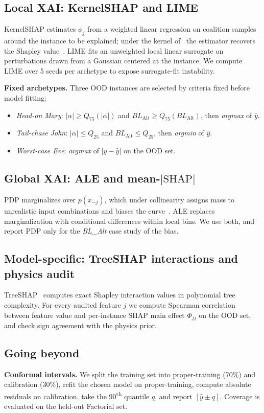 \documentclass[conference]{IEEEtran}
\begin{document}
\subsection{Local XAI: KernelSHAP and LIME}
KernelSHAP estimates $\phi_j$ from a weighted linear regression on coalition samples around the instance to be explained; under the kernel of~\cite{lundberg2017} the estimator recovers the Shapley value~\cite{shapley1953}. LIME fits an unweighted local linear surrogate on perturbations drawn from a Gaussian centered at the instance. We compute LIME over 5 seeds per archetype to expose surrogate-fit instability.

\textbf{Fixed archetypes.} Three OOD instances are selected by criteria fixed before model fitting:
\begin{itemize}
    \item \textit{Head-on Mary}: $|\alpha| \geq Q_{75}(|\alpha|)$ and $BL_{\text{Alt}} \geq Q_{75}(BL_{\text{Alt}})$, then \textit{argmax} of $\hat{y}$.
    \item \textit{Tail-chase John}: $|\alpha| \leq Q_{25}$ and $BL_{\text{Alt}} \leq Q_{25}$, then \textit{argmin} of $\hat{y}$.
    \item \textit{Worst-case Eve}: \textit{argmax} of $|y - \hat{y}|$ on the OOD set.
\end{itemize}

\subsection{Global XAI: ALE and mean-$|\text{SHAP}|$}
PDP marginalizes over $p(x_{-j})$, which under collinearity assigns mass to unrealistic input combinations and biases the curve~\cite{apley2020}. ALE replaces marginalization with conditional differences within local bins. We use both, and report PDP only for the \textit{BL\_Alt} case study of the bias.

\subsection{Model-specific: TreeSHAP interactions and physics audit}
TreeSHAP~\cite{lundberg2018consistent} computes exact Shapley interaction values in polynomial tree complexity. For every audited feature $j$ we compute Spearman correlation between feature value and per-instance SHAP main effect $\Phi_{jj}$ on the OOD set, and check sign agreement with the physics prior.

\subsection{Going beyond}
\textbf{Conformal intervals.} We split the training set into proper-training (70\%) and calibration (30\%), refit the chosen model on proper-training, compute absolute residuals on calibration, take the 90\textsuperscript{th} quantile $q$, and report $[\hat{y} \pm q]$. Coverage is evaluated on the held-out Factorial set.
\end{document}
